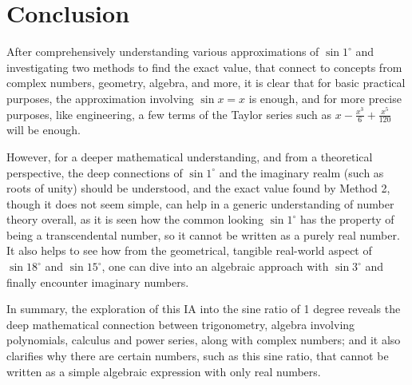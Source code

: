 \documentclass[12pt]{article}
\begin{document}
\section{Conclusion}
After comprehensively understanding various approximations of $\sin{1^{\circ}}$ and investigating two methods to find the exact value, that connect to concepts from complex numbers, geometry, algebra, and more, it is clear that for basic practical purposes, the approximation involving $\sin x = x$ is enough, and for more precise purposes, like engineering, a few terms of the Taylor series such as $x - \frac{x^3}{6} + \frac{x^5}{120}$ will be enough. 

However, for a deeper mathematical understanding, and from a theoretical perspective, the deep connections of $\sin{1^{\circ}}$ and the imaginary realm (such as roots of unity) should be understood, and the exact value found by Method 2, though it does not seem simple, can help in a generic understanding of number theory overall, as it is seen how the common looking $\sin{1^{\circ}}$ has the property of being a transcendental number, so it cannot be written as a purely real number. It also helps to see how from the geometrical, tangible real-world aspect of $\sin{18^{\circ}}$ and $\sin{15^{\circ}}$, one can dive into an algebraic approach with $\sin{3^{\circ}}$ and finally encounter imaginary numbers. 

In summary, the exploration of this IA into the sine ratio of 1 degree reveals the deep mathematical connection between trigonometry, algebra involving polynomials, calculus and power series, along with complex numbers; and it also clarifies why there are certain numbers, such as this sine ratio, that cannot be written as a simple algebraic expression with only real numbers. 
\pagebreak
\nocite{*}
\printbibliography
\end{document}
